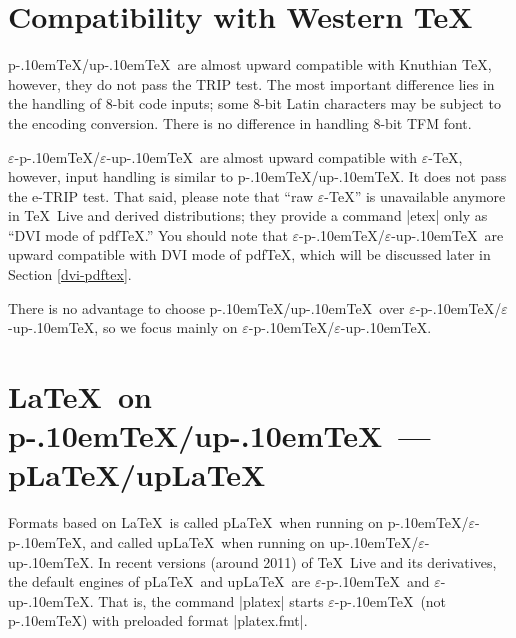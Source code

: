 \documentclass[a4paper,11pt,dvipdfmx]{article}
\let\emph=\origemph
\def\eTeXpre{$\varepsilon$-}
\def\eTeX{\leavevmode\hbox{\eTeXpre\TeX}}
\def\epTeX{\leavevmode\hbox{\eTeXpre\pTeX}}
\def\eupTeX{\leavevmode\hbox{\eTeXpre\upTeX}}
\def\pTeX{p\kern-.10em\TeX}\def\upTeX{u\pTeX}
\def\pLaTeX{p\LaTeX}\def\upLaTeX{u\pLaTeX}
\def\pdfTeX{pdf\TeX}
\def\TL{\TeX\ Live\xspace}
\begin{document}
\section{Compatibility with Western \TeX}\label{compat}

\pTeX/\upTeX\ are almost upward compatible with Knuthian \TeX,
however, they do not pass the TRIP test.
The most important difference lies in the handling of 8-bit code inputs;
some 8-bit Latin characters may be subject to the encoding conversion.
There is no difference in handling 8-bit TFM font.

\epTeX/\eupTeX\ are almost upward compatible with \eTeX,
however, input handling is similar to \pTeX/\upTeX.
It does not pass the e-TRIP test.
That said, please note that ``raw \eTeX'' is unavailable anymore
in \TL and derived distributions;
they provide a command |etex| only as ``DVI mode of \pdfTeX.''
You should note that
\epTeX/\eupTeX\ are \emph{not} upward compatible with DVI mode of \pdfTeX,
which will be discussed later in Section \ref{dvi-pdftex}.

There is no advantage to choose \pTeX/\upTeX\ over \epTeX/\eupTeX,
so we focus mainly on \epTeX/\eupTeX.

\section{\LaTeX\ on \pTeX/\upTeX\ --- \pLaTeX/\upLaTeX}

Formats based on \LaTeX\ is called \pLaTeX\ when running on \pTeX/\epTeX,
and called \upLaTeX\ when running on \upTeX/\eupTeX.
In recent versions (around 2011) of \TL and its derivatives,
the default engines of \pLaTeX\ and \upLaTeX\ are \epTeX\ and \eupTeX.
That is, the command |platex| starts \epTeX\ (not \pTeX) with
preloaded format |platex.fmt|.
\end{document}

